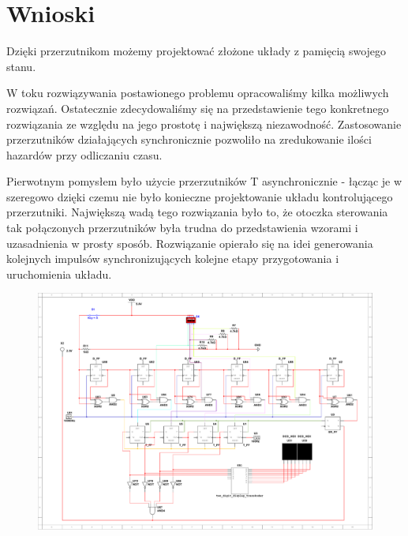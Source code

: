 \documentclass[a4paper]{article}
\begin{document}
\section{Wnioski}
Dzięki przerzutnikom możemy projektować złożone układy z pamięcią swojego stanu. 

W toku rozwiązywania postawionego problemu opracowaliśmy kilka możliwych rozwiązań. Ostatecznie
zdecydowaliśmy się na przedstawienie tego konkretnego rozwiązania ze względu na jego prostotę i 
największą niezawodność. Zastosowanie przerzutników działających synchronicznie pozwoliło na zredukowanie
ilości hazardów przy odliczaniu czasu.
\pagebreak

Pierwotnym pomysłem było użycie przerzutników T asynchronicznie - łącząc je w szeregowo dzięki czemu 
nie było konieczne projektowanie układu kontrolującego przerzutniki. Największą wadą tego rozwiązania
było to, że otoczka sterowania tak połączonych przerzutników była trudna do przedstawienia wzorami i 
uzasadnienia w prosty sposób. Rozwiązanie opierało się na idei generowania kolejnych impulsów 
synchronizujących kolejne etapy przygotowania i uruchomienia układu.

\begin{figure}[H]
    \centering
    \includegraphics[width=\textwidth]{lab2_1.pdf}
\end{figure}
\pagebreak
\end{document}
